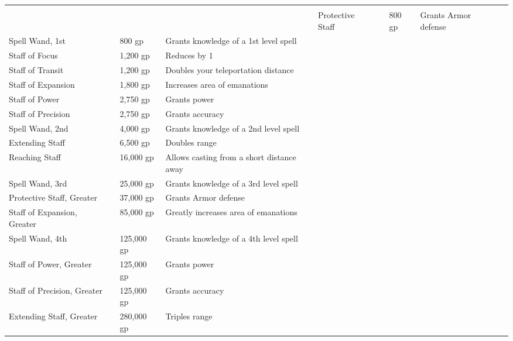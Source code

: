 
\begin{longtablewrapper}
\begin{longtable}{p{15em} p{3em} p{6em} p{25em} p{3em}}

 \\
 &  &  &  &  \tableheaderrule
Protective Staff &  & 800 gp & Grants  Armor defense & \pageref{item:Protective Staff} \\
Spell Wand, 1st &  & 800 gp & Grants knowledge of a 1st level spell & \pageref{item:Spell Wand, 1st} \\
Staff of Focus &  & 1,200 gp & Reduces  by 1 & \pageref{item:Staff of Focus} \\
Staff of Transit &  & 1,200 gp & Doubles your teleportation distance & \pageref{item:Staff of Transit} \\
Staff of Expansion &  & 1,800 gp & Increases area of emanations & \pageref{item:Staff of Expansion} \\
Staff of Power &  & 2,750 gp & Grants   power & \pageref{item:Staff of Power} \\
Staff of Precision &  & 2,750 gp & Grants  accuracy & \pageref{item:Staff of Precision} \\
Spell Wand, 2nd &  & 4,000 gp & Grants knowledge of a 2nd level spell & \pageref{item:Spell Wand, 2nd} \\
Extending Staff &  & 6,500 gp & Doubles range & \pageref{item:Extending Staff} \\
Reaching Staff &  & 16,000 gp & Allows casting from a short distance away & \pageref{item:Reaching Staff} \\
Spell Wand, 3rd &  & 25,000 gp & Grants knowledge of a 3rd level spell & \pageref{item:Spell Wand, 3rd} \\
Protective Staff, Greater &  & 37,000 gp & Grants  Armor defense & \pageref{item:Protective Staff, Greater} \\
Staff of Expansion, Greater &  & 85,000 gp & Greatly increases area of emanations & \pageref{item:Staff of Expansion, Greater} \\
Spell Wand, 4th &  & 125,000 gp & Grants knowledge of a 4th level spell & \pageref{item:Spell Wand, 4th} \\
Staff of Power, Greater &  & 125,000 gp & Grants   power & \pageref{item:Staff of Power, Greater} \\
Staff of Precision, Greater &  & 125,000 gp & Grants  accuracy & \pageref{item:Staff of Precision, Greater} \\
Extending Staff, Greater &  & 280,000 gp & Triples range & \pageref{item:Extending Staff, Greater} \\

\end{longtable}
\end{longtablewrapper}
